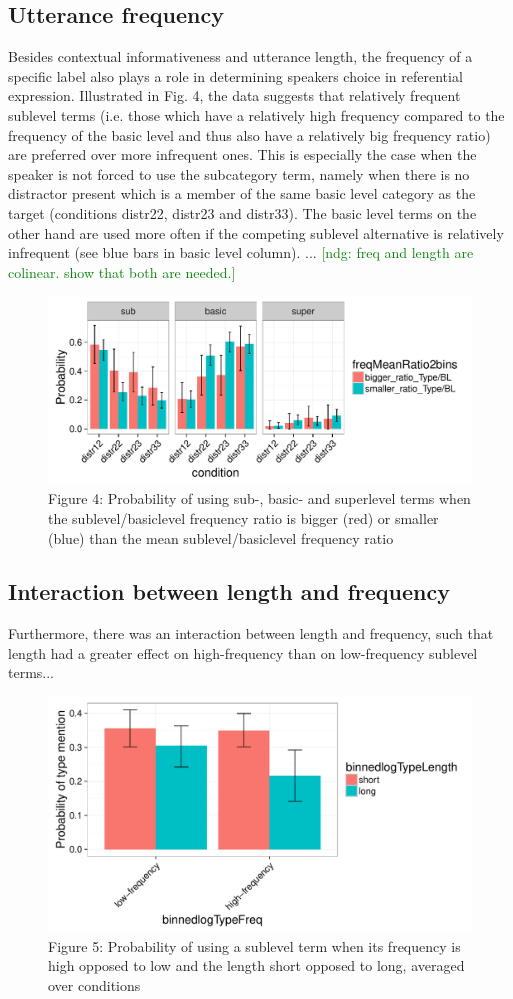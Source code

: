 \documentclass[10pt,letterpaper]{article}
\newcommand{\ndg}[1]{\textcolor{Green}{[ndg: #1]}}
\begin{document}
\subsection{\bf Utterance frequency}
Besides contextual informativeness and utterance length, the frequency of a specific label also plays a role in determining speakers choice in referential expression. Illustrated in Fig. 4, the data suggests that relatively frequent sublevel terms (i.e. those which have a relatively high frequency compared to the frequency of the basic level and thus also have a relatively big frequency ratio) are preferred over more infrequent ones. This is especially the case when the speaker is not forced to use the subcategory term, namely when there is no distractor present which is a member of the same basic level category as the target (conditions distr22, distr23 and distr33). The basic level terms on the other hand are used more often if the competing sublevel alternative is relatively infrequent (see blue bars in basic level column). ...
\ndg{freq and length are colinear. show that both are needed.}

\begin{figure}[ht!]
\centering
\includegraphics[width=.5\textwidth]{graphs/frequencyRatio}
\caption{Figure 4: Probability of using sub-, basic- and superlevel terms when the sublevel/basiclevel frequency ratio is bigger (red) or smaller (blue) than the mean  sublevel/basiclevel frequency ratio \label{overflow}}
\end{figure}

\subsection{\bf Interaction between length and frequency}
Furthermore, there was an interaction between length and frequency, such that length had a greater effect on high-frequency than on low-frequency sublevel terms...

\begin{figure}[ht!]
\centering
\includegraphics[width=.5\textwidth]{graphs/freq-length-interaction-noconds}
\caption{Figure 5: Probability of using a sublevel term when its frequency is high opposed to low and the length short opposed to long, averaged over conditions \label{overflow}}
\end{figure}
\end{document}

